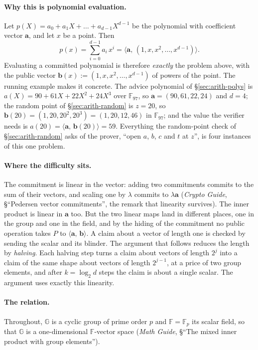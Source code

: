 \documentclass[11pt,a4paper]{article}
\theoremstyle{definition}
\newcommand{\F}{\mathbb{F}}
\newcommand{\G}{\mathbb{G}}
\newcommand{\ip}[2]{\langle #1,\, #2 \rangle}
\begin{document}
\paragraph{Why this is polynomial evaluation.}
Let $p(X) = a_0 + a_1 X + \dots + a_{d-1} X^{d-1}$ be the polynomial
with coefficient vector $\mathbf a$, and let $x$ be a point. Then
\[
p(x) = \sum_{i=0}^{d-1} a_i\,x^i = \ip{\mathbf a}{(1, x, x^2, \dots,
  x^{d-1})} .
\]
Evaluating a committed polynomial is therefore \emph{exactly} the
problem above, with the public vector
$\mathbf b(x) := (1, x, x^2, \dots, x^{d-1})$ of powers of the point.
The running example makes it concrete. The advice polynomial of
\S\ref{sec:arith-polys} is $a(X) = 90 + 61X + 22X^2 + 24X^3$ over
$\F_{97}$, so $\mathbf a = (90, 61, 22, 24)$ and $d = 4$; the random
point of \S\ref{sec:arith-random} is $z = 20$, so
$\mathbf b(20) = (1, 20, 20^2, 20^3) = (1, 20, 12, 46)$ in $\F_{97}$;
and the value the verifier needs is
$a(20) = \ip{\mathbf a}{\mathbf b(20)} = 59$. Everything the random-point
check of \S\ref{sec:arith-random} asks of the prover, ``open $a$, $b$,
$c$ and $t$ at $z$'', is four instances of this one problem.

\paragraph{Where the difficulty sits.}
The commitment is linear in the vector: adding two commitments commits
to the sum of their vectors, and scaling one by $\lambda$ commits to
$\lambda\mathbf a$ (\emph{Crypto Guide}, \S``Pedersen vector
commitments'', the remark that linearity survives). The inner product is
linear in $\mathbf a$ too. But the two linear maps land in different
places, one in the group and one in the field, and by the hiding of the
commitment no public operation takes $P$ to $\ip{\mathbf a}{\mathbf b}$.
A claim about a vector of length one is checked by sending the scalar and
its blinder.
The argument that follows reduces the length by \emph{halving}. Each
halving step turns a claim about vectors of length $2^j$ into a claim of
the same shape about vectors of length $2^{j-1}$, at a price of two group
elements, and after $k = \log_2 d$ steps the claim is about a single
scalar. The argument uses exactly this linearity.

\paragraph{The relation.}
Throughout, $\G$ is a cyclic group of prime order $p$ and $\F = \F_p$ its scalar
field, so that $\G$ is a one-dimensional $\F$-vector space (\emph{Math
Guide}, \S``The mixed inner product with group elements'').
\end{document}

